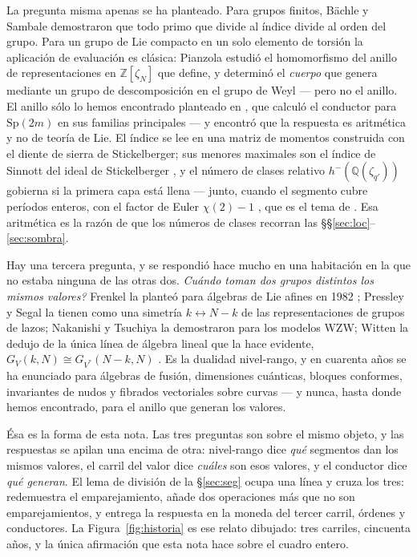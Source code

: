 \documentclass[11pt,a4paper]{article}
\theoremstyle{definition}
\newcommand{\Sp}{\mathrm{Sp}}
\newcommand{\ZZ}{\mathbb{Z}}
\newcommand{\QQ}{\mathbb{Q}}
\begin{document}
La pregunta misma apenas se ha planteado. Para grupos finitos, B\"achle y Sambale \cite{BS}
demostraron que todo primo que divide al \'indice divide al orden del grupo. Para un grupo de Lie
compacto en un solo elemento de torsi\'on la aplicaci\'on de evaluaci\'on es cl\'asica: Pianzola
estudi\'o el homomorfismo del anillo de representaciones en $\ZZ[\zeta_N]$ que define, y determin\'o
el \emph{cuerpo} que genera mediante un grupo de descomposici\'on en el grupo de Weyl
\cite[Prop.~10, Prop.~13(b)]{Pia87} --- pero no el anillo. El anillo s\'olo lo hemos encontrado
planteado en \cite{Cond}, que calcul\'o el
conductor para $\Sp(2m)$ en sus familias principales --- y encontr\'o que la respuesta es
aritm\'etica y no de teor\'ia de Lie.
El \'indice se lee en una matriz de momentos construida con el diente de sierra de Stickelberger;
sus menores maximales son el \'indice de Sinnott del ideal de Stickelberger \cite{Sin78}, y el
n\'umero de clases relativo $h^-(\QQ(\zeta_{q'}))$ gobierna si la primera capa est\'a llena ---
junto, cuando el segmento cubre per\'iodos enteros, con el factor de Euler $\chi(2)-1$
\cite[Cor.~17]{Cond}, que es el tema de \cite{II}. Esa aritm\'etica es la raz\'on de que los n\'umeros de clases recorran las \S\S\ref{sec:loc}--\ref{sec:sombra}.

Hay una tercera pregunta, y se respondi\'o hace mucho en una habitaci\'on en la que no estaba
ninguna de las otras dos. \emph{\textquestiondown Cu\'ando toman dos grupos distintos los mismos
valores?} Frenkel la plante\'o para \'algebras de Lie afines en 1982 \cite{Fre82}; Pressley y Segal la tienen
como una simetr\'ia $k\leftrightarrow N-k$ de las representaciones de grupos de lazos; Nakanishi y
Tsuchiya la demostraron para los modelos WZW; Witten la dedujo de la \'unica l\'inea de \'algebra
lineal que la hace evidente, $G_V(k,N)\cong G_{V^*}(N-k,N)$ \cite{PS86,NT92,Wit93}. Es la dualidad
nivel-rango, y en cuarenta a\~nos se ha enunciado para \'algebras de fusi\'on, dimensiones
cu\'anticas, bloques conformes, invariantes de nudos y fibrados vectoriales sobre curvas --- y
nunca, hasta donde hemos encontrado, para el anillo que generan los valores.

\'Esa es la forma de esta nota. Las tres preguntas son sobre el mismo objeto, y las respuestas se
apilan una encima de otra: nivel-rango dice \emph{qu\'e} segmentos dan los mismos valores, el carril
del valor dice \emph{cu\'ales} son esos valores, y el conductor dice \emph{qu\'e generan}. El lema
de divisi\'on de la \S\ref{sec:seg} ocupa una l\'inea y cruza los tres: redemuestra el
emparejamiento, a\~nade dos operaciones m\'as que no son emparejamientos, y entrega la respuesta en
la moneda del tercer carril, \'ordenes y conductores. La Figura~\ref{fig:historia} es ese relato
dibujado: tres carriles, cincuenta a\~nos, y la \'unica afirmaci\'on que esta nota hace sobre el
cuadro entero.
\end{document}
